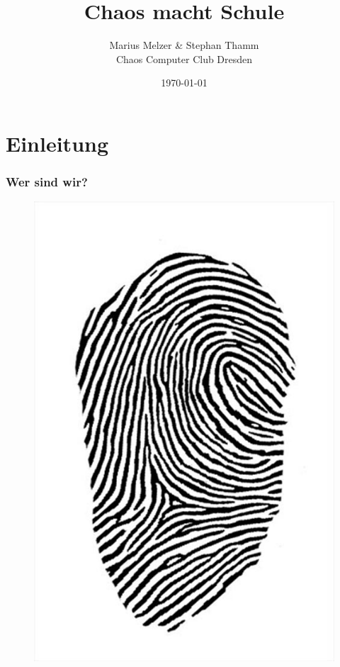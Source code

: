 \documentclass[12pt]{beamer}
\title{Chaos macht Schule}
\author{\small Marius Melzer \& Stephan Thamm\\\large Chaos Computer Club Dresden}
\date{\today}
\begin{document}
\maketitle

\section{Einleitung}

\begin{frame}
  \frametitle{Wer sind wir?}
  \begin{figure}
    \includegraphics[height=0.7\textheight]{img/fingerabdruck.jpg}
  \end{figure}
\end{frame}
\end{document}
